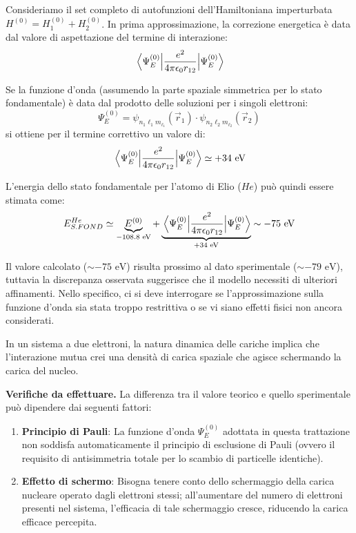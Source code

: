 Consideriamo il set completo di autofunzioni dell'Hamiltoniana imperturbata \( H^{(0)} = H_1^{(0)} + H_2^{(0)} \). In prima approssimazione, la correzione energetica è data dal valore di aspettazione del termine di interazione:
\begin{equation}
    \mel{\Psi_E^{(0)}}{\frac{e^2}{4\pi \epsilon_0 r_{12}}}{\Psi_E^{(0)}}
\end{equation}

Se la funzione d'onda (assumendo la parte spaziale simmetrica per lo stato fondamentale) è data dal prodotto delle soluzioni per i singoli elettroni:
\begin{equation}
    \Psi_E^{(0)} = \psi_{n_1 \ell_1 m_{\ell_1}}(\vec{r}_1) \cdot \psi_{n_2 \ell_2 m_{\ell_2}}(\vec{r}_2)
\end{equation}
si ottiene per il termine correttivo un valore di:
\begin{equation}
    \mel{\Psi_E^{(0)}}{\frac{e^2}{4\pi \epsilon_0 r_{12}}}{\Psi_E^{(0)}} \simeq +34 \text{ eV}
\end{equation}

L'energia dello stato fondamentale per l'atomo di Elio (\(He\)) può quindi essere stimata come:
\begin{equation}
    E_{S.FOND}^{He} \simeq \underbrace{E^{(0)}}_{-108.8 \text{ eV}} + \underbrace{\mel{\Psi_E^{(0)}}{\frac{e^2}{4\pi \epsilon_0 r_{12}}}{\Psi_E^{(0)}}}_{+34 \text{ eV}} \sim -75 \text{ eV}
\end{equation}

Il valore calcolato (\(\sim -75 \text{ eV}\)) risulta prossimo al dato sperimentale (\(\sim -79 \text{ eV}\)), tuttavia la discrepanza osservata suggerisce che il modello necessiti di ulteriori affinamenti. Nello specifico, ci si deve interrogare se l'approssimazione sulla funzione d'onda sia stata troppo restrittiva o se vi siano effetti fisici non ancora considerati. 

In un sistema a due elettroni, la natura dinamica delle cariche implica che l'interazione mutua crei una densità di carica spaziale che agisce schermando la carica del nucleo.

\begin{attention}
\textbf{Verifiche da effettuare.} La differenza tra il valore teorico e quello sperimentale può dipendere dai seguenti fattori:
\begin{enumerate}
    \item \textbf{Principio di Pauli}: La funzione d'onda \(\Psi_E^{(0)}\) adottata in questa trattazione non soddisfa automaticamente il principio di esclusione di Pauli (ovvero il requisito di antisimmetria totale per lo scambio di particelle identiche).
    \item \textbf{Effetto di schermo}: Bisogna tenere conto dello schermaggio della carica nucleare operato dagli elettroni stessi; all'aumentare del numero di elettroni presenti nel sistema, l'efficacia di tale schermaggio cresce, riducendo la carica efficace percepita.
\end{enumerate}
\end{attention}

